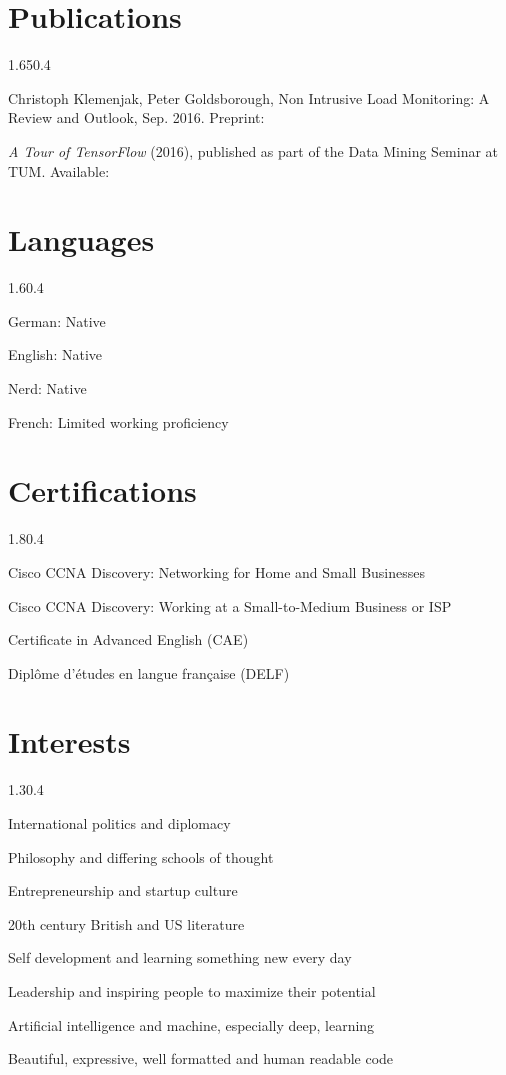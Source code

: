 \section{Publications}{1.65}{0.4}
\begin{simpleentry}
  \item Christoph Klemenjak, Peter Goldsborough, Non Intrusive Load Monitoring: A Review and Outlook, Sep. 2016. Preprint: 
  \item \emph{A Tour of TensorFlow} (2016), published as part of the Data Mining Seminar at TUM. Available: 
\end{simpleentry}

\section{Languages}{1.6}{0.4}
\begin{simpleentry}
  \item German: Native
  \item English: Native
  \item Nerd: Native
  \item French: Limited working proficiency
\end{simpleentry}

\section{Certifications}{1.8}{0.4}
\begin{simpleentry}
  \item Cisco CCNA Discovery: Networking for Home and Small Businesses
  \item Cisco CCNA Discovery: Working at a Small-to-Medium Business or ISP
  \item Certificate in Advanced English (CAE)
  \item Diplôme d'études en langue française (DELF)
\end{simpleentry}

\section{Interests}{1.3}{0.4}
\begin{simpleentry}
  \item International politics and diplomacy
  \item Philosophy and differing schools of thought
  \item Entrepreneurship and startup culture
  \item 20th century British and US literature
  \item Self development and learning something new every day
  \item Leadership and inspiring people to maximize their potential
  \item Artificial intelligence and machine, especially deep, learning
  \item Beautiful, expressive, well formatted and human readable code
\end{simpleentry}

